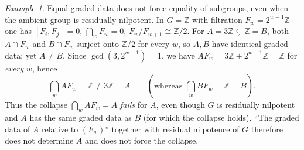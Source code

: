 \documentclass{amsart}
\theoremstyle{definition}
\theoremstyle{remark}
\newtheorem{example}{Example}
\begin{document}
\begin{example}\label{ex:Z}
Equal graded data does not force equality of subgroups, even when the ambient group
is residually nilpotent. In $G=\mathbb Z$ with filtration $F_w=2^{w-1}\mathbb Z$ one
has $[F_i,F_j]=0$, $\bigcap_w F_w=0$, $F_w/F_{w+1}\cong\mathbb Z/2$. For
$A=3\mathbb Z\subsetneq\mathbb Z=B$, both $A\cap F_w$ and $B\cap F_w$ surject onto
$\mathbb Z/2$ for every $w$, so $A,B$ have identical graded data; yet $A\ne B$. Since
$\gcd(3,2^{w-1})=1$, we have $AF_w=3\mathbb Z+2^{w-1}\mathbb Z=\mathbb Z$ for
\emph{every} $w$, hence
\[
\bigcap_w A F_w=\mathbb Z\ne 3\mathbb Z=A
\qquad(\text{whereas }\bigcap_w BF_w=\mathbb Z=B).
\]
Thus the collapse $\bigcap_w AF_w=A$ \emph{fails} for $A$, even though $G$ is residually
nilpotent and $A$ has the same graded data as $B$ (for which the collapse holds). ``The
graded data of $A$ relative to $(F_w)$'' together with residual nilpotence of $G$
therefore does not determine $A$ and does not force the collapse.
\end{example}
\end{document}
